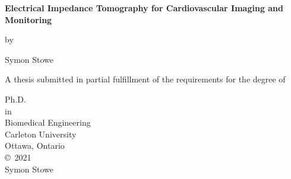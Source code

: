 
\thispagestyle{empty}
\begin{center}

\LARGE

\textbf{Electrical Impedance Tomography for Cardiovascular Imaging and Monitoring}

\vspace{6mm}
\large
by 

\vspace{-2mm}
\LARGE
Symon Stowe

\vspace{15mm}
\large
A thesis submitted in partial fulfillment of 
the requirements for the degree of

\vspace{12mm}
\large
Ph.D.\\

in \\

\vspace{1mm}
Biomedical Engineering\\

\vspace{12mm}
\large
Carleton University \\
Ottawa, Ontario\\

\vspace{12mm}
\large
\copyright~2021 \\
Symon Stowe
\end{center}
